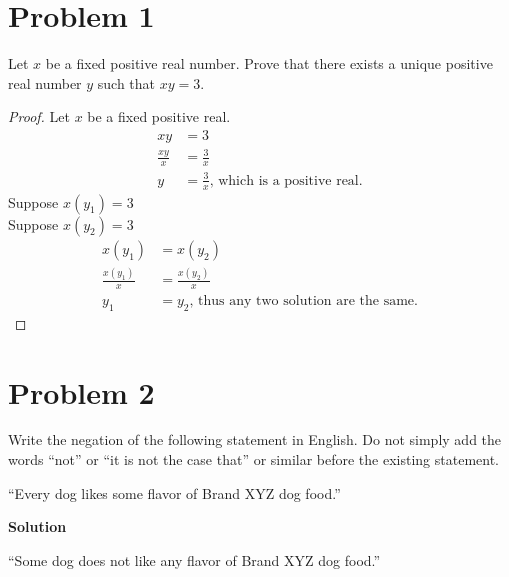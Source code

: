 \documentclass{article}
\newenvironment{problem}[1]{
  \nobreak\section*{Problem #1}
}{}
\begin{document}
  \begin{problem}{1}
    Let $x$ be a fixed positive real number. Prove that there exists a unique positive real number $y$ such that $xy = 3$.
    \begin{proof} Let $x$ be a fixed positive real.
      \begin{equation*}
        \begin{split}
          xy & = 3\\
          \frac{xy}{x} & = \frac{3}{x}\\
          y & = \frac{3}{x}\text{, which is a positive real.}
        \end{split}
      \end{equation*}
      Suppose $x(y_1) = 3$\\
      Suppose $x(y_2) = 3$
      \begin{equation*}
        \begin{split}
          x(y_1) & = x(y_2)\\
          \frac{x(y_1)}{x} & = \frac{x(y_2)}{x}\\
          y_1 & = y_2\text{, thus any two solution are the same.}
        \end{split}
      \end{equation*}
    \end{proof}
  \end{problem}

  \begin{problem}{2}
    Write the negation of the following statement in English. Do not simply add the words “not” or “it is not the case that” or similar before the existing statement.
    \begin{center}
      “Every dog likes some flavor of Brand XYZ dog food.”
    \end{center}
    \textbf{Solution}
    \begin{center}
      “Some dog does not like any flavor of Brand XYZ dog food.”
    \end{center}
  \end{problem}
\end{document}
